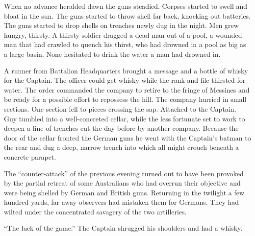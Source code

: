 When no advance heralded dawn the guns steadied. Corpses started to swell and bloat in the sun. The guns started to throw shell far back, knocking out batteries. The guns started to drop shells on trenches newly dug in the night. Men grew hungry, thirsty. A thirsty soldier dragged a dead man out of a pool, a wounded man that had crawled to quench his thirst, who had drowned in a pool as big as a large basin. None hesitated to drink the water a man had drowned in.

A runner from Battalion Headquarters brought a message and a bottle of whisky for the Captain. The officer could get whisky while the rank and file thirsted for water. The order commanded the company to retire to the fringe of Messines and be ready for a possible effort to repossess the hill. The company hurried in small sections. One section fell to pieces crossing the sap. Attached to the Captain, Guy tumbled into a well-concreted cellar, while the less fortunate set to work to deepen a line of trenches cut the day before by another company. Because the door of the cellar fronted the German guns he went with the Captain's batman to the rear and dug a deep, narrow trench into which all might crouch beneath a concrete parapet.

The ``counter-attack'' of the previous evening turned out to have been provoked by the partial retreat of some Australians who had overrun their objective and were being shelled by German and British guns. Returning in the twilight a few hundred yards, far-away observers had mistaken them for Germans. They had wilted under the concentrated savagery of the two artilleries.

``The luck of the game.'' The Captain shrugged his shoulders and had a whisky.

